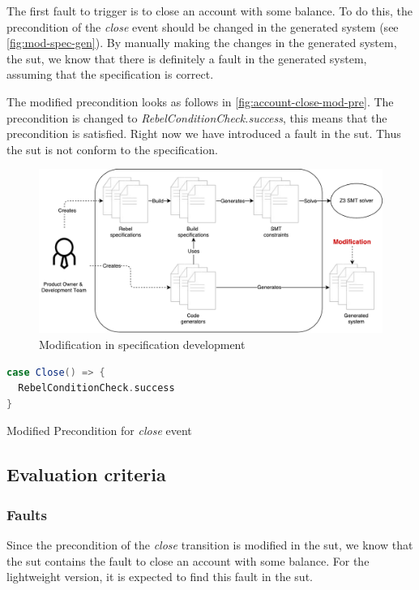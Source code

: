 The first fault to trigger is to close an account with some balance. To do this, the precondition of the \textit{close} event should be changed in the generated system (see \autoref{fig:mod-spec-gen}). By manually making the changes in the generated system, the \gls{sut}, we know that there is definitely a fault in the generated system, assuming that the specification is correct.

The modified precondition looks as follows in
\autoref{fig:account-close-mod-pre}. The precondition is changed to
\textit{RebelConditionCheck.success}, this means that the precondition is
satisfied. Right now we have introduced a fault in the \gls{sut}.
Thus the \gls{sut} is not conform to the specification.

\begin{figure}[h!]
  \centering
  \includegraphics[width=\linewidth{}]{figures/modified-sut.pdf}
  \caption{Modification in specification development}\label{fig:mod-spec-gen}
\end{figure}
\FloatBarrier

\begin{sourcecode}[h!]
\begin{lstlisting}[language=scala]
case Close() => {
  RebelConditionCheck.success
}
\end{lstlisting}
\caption{Modified Precondition for \textit{close} event}\label{fig:account-close-mod-pre}
\end{sourcecode}
\FloatBarrier

\subsection{Evaluation criteria}\label{sec:ch4-eval-criteria}

\subsubsection{Faults}
Since the precondition of the \textit{close} transition is modified in the \gls{sut},
we know that the \gls{sut} contains the fault to close an account with some balance. For
the lightweight version, it is expected to find this fault in the \gls{sut}.

